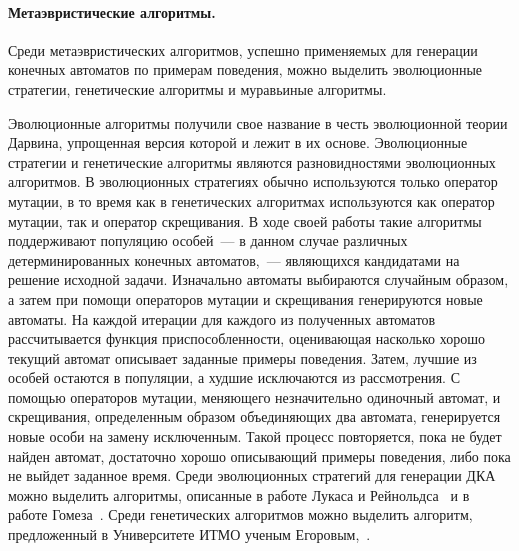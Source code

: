 \paragraph*{Метаэвристические алгоритмы.}
\label{sec:review:heuristic-dfa-inf:metaheuristic}
Среди метаэвристических алгоритмов, успешно применяемых для генерации конечных автоматов по примерам поведения, можно выделить эволюционные стратегии, генетические алгоритмы и муравьиные алгоритмы.

Эволюционные алгоритмы получили свое название в честь эволюционной теории Дарвина, упрощенная версия которой и лежит в их основе.
Эволюционные стратегии и генетические алгоритмы являются разновидностями эволюционных алгоритмов.
В эволюционных стратегиях обычно используются только оператор мутации, в то время как в генетических алгоритмах используются как оператор мутации, так и оператор скрещивания.
В ходе своей работы такие алгоритмы поддерживают популяцию особей~--- в данном случае различных детерминированных конечных автоматов,~--- являющихся кандидатами на решение исходной задачи.
Изначально автоматы выбираются случайным образом, а затем при помощи операторов мутации и скрещивания генерируются новые автоматы.
На каждой итерации для каждого из полученных автоматов рассчитывается функция приспособленности, оценивающая насколько хорошо текущий автомат описывает заданные примеры поведения.
Затем, лучшие из особей остаются в популяции, а худшие исключаются из рассмотрения.
С помощью операторов мутации, меняющего незначительно одиночный автомат, и скрещивания, определенным образом объединяющих два автомата, генерируется новые особи на замену исключенным.
Такой процесс повторяется, пока не будет найден автомат, достаточно хорошо описывающий примеры поведения, либо пока не выйдет заданное время.
Среди эволюционных стратегий для генерации ДКА можно выделить алгоритмы, описанные в работе Лукаса и Рейнольдса~\cite{DBLP:journals/pami/LucasR05} и в работе Гомеза~\cite{DBLP:conf/cec/Gomez06}.
Среди генетических алгоритмов можно выделить алгоритм, предложенный в Университете ИТМО ученым Егоровым,~\cite{genetic-algs-dfa-inf-egorov-13}.

